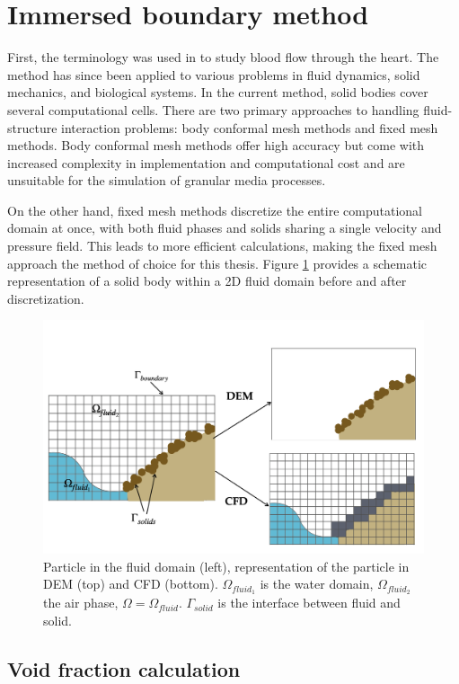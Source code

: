 \section{Immersed boundary method}
First, the terminology was used in \cite{peskin1972flow} to study blood flow through the heart. The method has since been applied to various problems in fluid dynamics, solid mechanics, and biological systems. In the current method, solid bodies cover several computational cells. There are two primary approaches to handling fluid-structure interaction problems: body conformal mesh methods and fixed mesh methods. Body conformal mesh methods offer high accuracy but come with increased complexity in implementation and computational cost and are unsuitable for the simulation of granular media processes.

On the other hand, fixed mesh methods discretize the entire computational domain at once, with both fluid phases and solids sharing a single velocity and pressure field. This leads to more efficient calculations, making the fixed mesh approach the method of choice for this thesis. Figure \ref{fig:CFDDEM} provides a schematic representation of a solid body within a 2D fluid domain before and after discretization. 
\begin{figure}[!ht]
    \centering
    \includegraphics[width=14cm]{Images/CFD_DEM_scheme.png}
    \caption{Particle in the fluid domain (left), representation of the particle in DEM (top) and CFD (bottom).  $\Omega_{fluid_1}$ is the water domain, $\Omega_{fluid_2}$ the air phase, $\Omega = \Omega_{fluid}$. $\Gamma_{solid}$ is the interface between fluid and solid. 
}
    \label{fig:CFDDEM}
\end{figure}


\subsection{Void fraction calculation}

